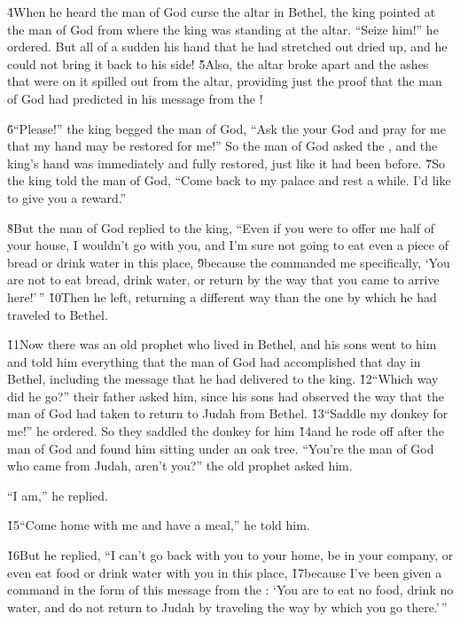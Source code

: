 \v{4}When he heard the man of God curse the altar in Bethel, the king pointed at the man of God from where the king was standing at the altar. ``Seize him!'' he ordered. But all of a sudden his hand that he had stretched out dried up, and he could not bring it back to his side! \v{5}Also, the altar broke apart and the ashes that were on it spilled out from the altar, providing just the proof that the man of God had predicted in his message from the !

\v{6}``Please!'' the king begged the man of God, ``Ask the  your God and pray for me that my hand may be restored for me!'' So the man of God asked the , and the king's hand was immediately and fully restored, just like it had been before. \v{7}So the king told the man of God, ``Come back to my palace and rest a while. I'd like to give you a reward.''

\v{8}But the man of God replied to the king, ``Even if you were to offer me half of your house, I wouldn't go with you, and I'm sure not going to eat even a piece of bread or drink water in this place, \v{9}because the  commanded me specifically, `You are not to eat bread, drink water, or return by the way that you came to arrive here!'\,'' \v{10}Then he left, returning a different way than the one by which he had traveled to Bethel.

\v{11}Now there was an old prophet who lived in Bethel, and his sons went to him and told him everything that the man of God had accomplished that day in Bethel, including the message that he had delivered to the king. \v{12}``Which way did he go?'' their father asked him, since his sons had observed the way that the man of God had taken to return to Judah from Bethel. \v{13}``Saddle my donkey for me!'' he ordered. So they saddled the donkey for him \v{14}and he rode off after the man of God and found him sitting under an oak tree. ``You're the man of God who came from Judah, aren't you?'' the old prophet asked him.

``I am,'' he replied.

\v{15}``Come home with me and have a meal,'' he told him.

\v{16}But he replied, ``I can't go back with you to your home, be in your company, or even eat food or drink water with you in this place, \v{17}because I've been given a command in the form of this message from the : `You are to eat no food, drink no water, and do not return to Judah by traveling the way by which you go there.'\,''


